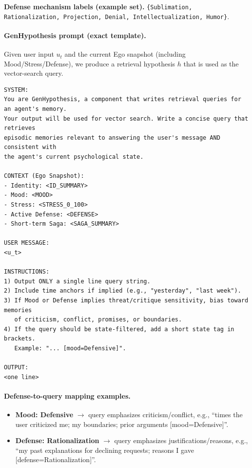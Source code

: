 \documentclass{article}
\begin{document}
\textbf{Defense mechanism labels (example set).}
\texttt{\{Sublimation, Rationalization, Projection, Denial, Intellectualization, Humor\}}.

\paragraph{GenHypothesis prompt (exact template).}
Given user input $u_t$ and the current Ego snapshot (including Mood/Stress/Defense), we produce a retrieval hypothesis $h$ that is used as the vector-search query.

\begin{verbatim}
SYSTEM:
You are GenHypothesis, a component that writes retrieval queries for an agent's memory.
Your output will be used for vector search. Write a concise query that retrieves
episodic memories relevant to answering the user's message AND consistent with
the agent's current psychological state.

CONTEXT (Ego Snapshot):
- Identity: <ID_SUMMARY>
- Mood: <MOOD>
- Stress: <STRESS_0_100>
- Active Defense: <DEFENSE>
- Short-term Saga: <SAGA_SUMMARY>

USER MESSAGE:
<u_t>

INSTRUCTIONS:
1) Output ONLY a single line query string.
2) Include time anchors if implied (e.g., "yesterday", "last week").
3) If Mood or Defense implies threat/critique sensitivity, bias toward memories
   of criticism, conflict, promises, or boundaries.
4) If the query should be state-filtered, add a short state tag in brackets.
   Example: "... [mood=Defensive]".

OUTPUT:
<one line>
\end{verbatim}

\paragraph{Defense-to-query mapping examples.}
\begin{itemize}
  \item \textbf{Mood: Defensive} $\rightarrow$ query emphasizes criticism/conflict, e.g., ``times the user criticized me; my boundaries; prior arguments [mood=Defensive]''.
  \item \textbf{Defense: Rationalization} $\rightarrow$ query emphasizes justifications/reasons, e.g., ``my past explanations for declining requests; reasons I gave [defense=Rationalization]''.
\end{itemize}
\end{document}
